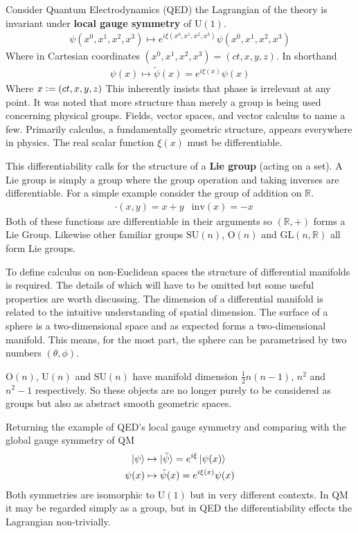 Consider Quantum Electrodynamics (QED) the Lagrangian of the theory is invariant under \textbf{local gauge symmetry} of $\mathrm{U}(1)$.
\begin{align*}
\psi(x^0,x^1,x^2,x^3) \mapsto e^{i \xi(x^0,x^1,x^2,x^3)} \psi(x^0,x^1,x^2,x^3)
\end{align*}
Where in Cartesian coordinates $(x^0,x^1,x^2,x^3)=(ct,x,y,z)$. In shorthand
\begin{align*}
\psi(x) \mapsto \tilde{\psi}(x)=e^{i \xi(x)} \psi(x)
\end{align*}
Where $x\vcentcolon=(ct,x,y,z)$ This inherently insists that phase is irrelevant at any point. It was noted that more structure than merely a group is being used concerning physical groups. Fields, vector spaces, and vector calculus to name a few. Primarily calculus, a fundamentally geometric structure, appears everywhere in physics. The real scalar function $\xi(x)$ must be differentiable.

This differentiability calls for the structure of a \textbf{Lie group} (acting on a set). A Lie group is simply a group where the group operation and taking inverses are differentiable. For a simple example consider the group of addition on $\mathbb{R}$.
\begin{align*}
&\cdot(x,y) = x+y &\mathrm{inv}(x) = -x
\end{align*}
Both of these functions are differentiable in their arguments so $(\mathbb{R},+)$ forms a Lie Group. Likewise other familiar groups $\mathrm{SU}(n)$, $\mathrm{O}(n)$ and $\mathrm{GL}(n,\mathbb{R})$ all form Lie groups.

To define calculus on non-Euclidean spaces the structure of differential manifolds is required. The details of which will have to be omitted but some useful properties are worth discussing. The dimension of a differential manifold is related to the intuitive understanding of spatial dimension. The surface of a sphere is a two-dimensional space and as expected forms a two-dimensional manifold. This means, for the most part, the sphere can be parametrised by two numbers $(\theta,\phi)$.

$\mathrm{O}(n)$, $\mathrm{U}(n)$ and $\mathrm{SU}(n)$ have manifold dimension $\frac{1}{2}n(n-1)$, $n^2$ and $n^2-1$ respectively. So these objects are no longer purely to be considered as groups but also as abstract smooth geometric spaces.

Returning the example of QED's local gauge symmetry and comparing with the global gauge symmetry of QM
\begin{align*}
\ket{\psi} &\mapsto \ket{\tilde{\psi}}=e^{i \xi} \ket{\psi(x)} \\
\psi(x) &\mapsto \tilde{\psi}(x)=e^{i \xi(x)} \psi(x)
\end{align*}
Both symmetries are isomorphic to $\mathrm{U}(1)$ but in very different contexts. In QM it may be regarded simply as a group, but in QED the differentiability effects the Lagrangian non-trivially.

